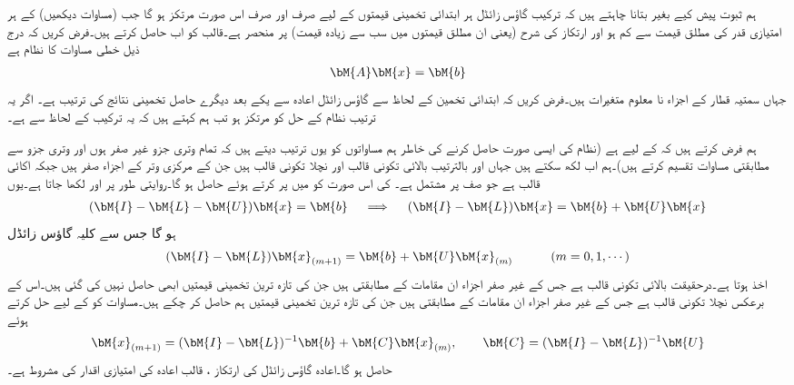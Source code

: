 ہم ثبوت پیش کیے بغیر بتانا چاہتے ہیں کہ ترکیب گاؤس زائڈل  ہر ابتدائی تخمینی قیمتوں کے لیے صرف اور صرف اس صورت مرتکز ہو گا جب    (مساوات  دیکھیں) کے ہر امتیازی قدر کی  مطلق قیمت  سے کم ہو اور ارتکاز کی شرح   (یعنی ان مطلق قیمتوں میں سب سے زیادہ قیمت) پر منحصر ہے۔قالب  کو اب حاصل کرتے ہیں۔فرض کریں کہ درج ذیل  خطی مساوات کا نظام ہے
\begin{align*}
\bM{A}\bM{x}=\bM{b}
\end{align*}
جہاں سمتیہ قطار    کے اجزاء نا معلوم متغیرات  ہیں۔فرض کریں کہ ابتدائی تخمین  کے لحاظ سے
  گاؤس زائڈل اعادہ سے یکے بعد دیگرے حاصل تخمینی نتائج کی ترتیب ہے۔ اگر یہ ترتیب نظام کے حل کو مرتکز ہو تب ہم کہتے ہیں کہ یہ ترکیب    کے لحاظ سے  ہے۔

ہم فرض کرتے ہیں کہ  کے لیے  ہے (نظام کی ایسی صورت حاصل کرنے کی خاطر ہم مساواتوں کو یوں ترتیب دیتے ہیں کہ تمام وتری جزو غیر صفر ہوں اور وتری جزو سے مطابقتی مساوات  تقسیم کرتے ہیں)۔ہم اب  لکھ سکتے ہیں جہاں  اور  بالترتیب بالائی تکونی قالب اور نچلا تکونی قالب ہیں جن کے مرکزی وتر کے اجزاء صفر ہیں جبکہ   اکائی قالب ہے جو  صف پر مشتمل ہے۔ کی اس صورت کو  میں پر کرتے ہوئے  حاصل ہو گا۔روایتی طور پر  اور  لکھا جاتا ہے۔یوں
\begin{align*}
(\bM{I}-\bM{L}-\bM{U})\bM{x}=\bM{b}\quad \implies \quad (\bM{I}-\bM{L})\bM{x}=\bM{b}+\bM{U}\bM{x}
\end{align*}
ہو گا جس سے کلیہ گاؤس زائڈل
\begin{align}\label{مساوات_خطی_اعدادی_مثال_ت}
(\bM{I}-\bM{L})\bM{x}_{(m+1)}=\bM{b}+\bM{U}\bM{x}_{(m)}\quad \quad \quad (m=0,1,\cdots)
\end{align}
اخذ ہوتا ہے۔درحقیقت  بالائی تکونی قالب ہے جس کے غیر صفر اجزاء ان مقامات کے مطابقتی ہیں جن کی تازہ ترین تخمینی قیمتیں ابھی حاصل نہیں کی گئی ہیں۔اس کے برعکس  نچلا تکونی قالب ہے جس کے غیر صفر اجزاء ان مقامات کے مطابقتی ہیں جن کی تازہ ترین تخمینی قیمتیں  ہم حاصل کر چکے ہیں۔مساوات  کو  کے لیے حل کرتے ہوئے
\begin{align}\label{مساوات_خطی_اعدادی_مثال_ٹ}
\bM{x}_{(m+1)}=(\bM{I}-\bM{L})^{-1}\bM{b}+\bM{C}\bM{x}_{(m)},\quad \quad \bM{C}=(\bM{I}-\bM{L})^{-1}\bM{U}
\end{align}
حاصل ہو گا۔اعادہ گاؤس زائڈل  کی ارتکاز ، قالب اعادہ  کی امتیازی اقدار کی مشروط ہے۔

